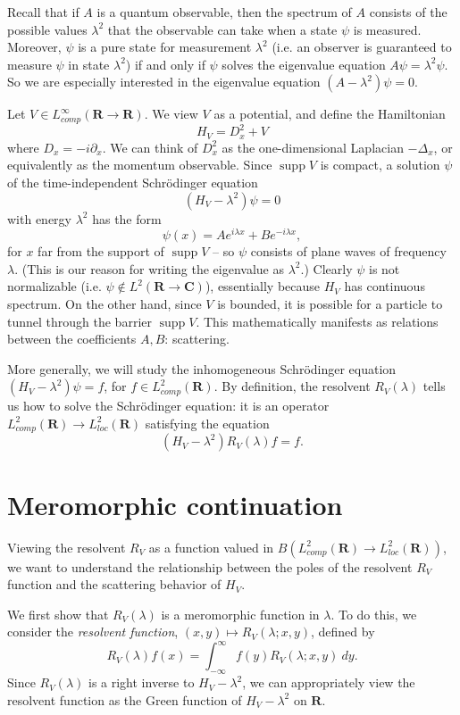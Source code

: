 \documentclass[12pt]{report}
\newcommand{\RR}{\mathbf{R}}
\newcommand{\CC}{\mathbf{C}}
\DeclareMathOperator{\supp}{supp}
\newcommand{\dfn}[1]{\emph{#1}\index{#1}}
\theoremstyle{definition}
\theoremstyle{remark}
\begin{document}

Recall that if $A$ is a quantum observable, then the spectrum of $A$ consists of the possible values $\lambda^2$ that the observable can take when a state $\psi$ is measured. Moreover, $\psi$ is a pure state for measurement $\lambda^2$ (i.e. an observer is guaranteed to measure $\psi$ in state $\lambda^2$) if and only if $\psi$ solves the eigenvalue equation $A\psi = \lambda^2 \psi$. So we are especially interested in the eigenvalue equation $(A - \lambda^2)\psi = 0$.

Let $V \in L^\infty_{comp}(\RR \to \RR)$. We view $V$ as a potential, and define the Hamiltonian
$$H_V = D_x^2 + V$$
where $D_x = -i\partial_x$. We can think of $D_x^2$ as the one-dimensional Laplacian $-\Delta_x$, or equivalently as the momentum observable. Since $\supp V$ is compact, a solution $\psi$ of the time-independent Schrödinger equation
$$(H_V - \lambda^2)\psi = 0$$
with energy $\lambda^2$ has the form
$$\psi(x) = Ae^{i\lambda x} + Be^{-i\lambda x},$$
for $x$ far from the support of $\supp V$ -- so $\psi$ consists of plane waves of frequency $\lambda$. (This is our reason for writing the eigenvalue as $\lambda^2$.) Clearly $\psi$ is not normalizable (i.e. $\psi \notin L^2(\RR \to \CC)$), essentially because $H_V$ has continuous spectrum. On the other hand, since $V$ is bounded, it is possible for a particle to tunnel through the barrier $\supp V$. This mathematically manifests as relations between the coefficients $A,B$: scattering.

More generally, we will study the inhomogeneous Schrödinger equation $(H_V - \lambda^2)\psi = f$, for $f \in L^2_{comp}(\RR)$. By definition, the resolvent $R_V(\lambda)$ tells us how to solve the Schrödinger equation: it is an operator $L^2_{comp}(\RR) \to L^2_{loc}(\RR)$ satisfying the equation
$$(H_V - \lambda^2)R_V(\lambda)f = f.$$

\section{Meromorphic continuation}
Viewing the resolvent $R_V$ as a function valued in $B(L^2_{comp}(\RR) \to L^2_{loc}(\RR))$, we want to understand the relationship between the poles of the resolvent $R_V$ function and the scattering behavior of $H_V$.

We first show that $R_V(\lambda)$ is a meromorphic function in $\lambda$. To do this, we consider the \dfn{resolvent function}, $(x, y) \mapsto R_V(\lambda; x, y)$, defined by
$$R_V(\lambda)f(x) = \int_{-\infty}^\infty f(y) R_V(\lambda; x, y) ~dy.$$
Since $R_V(\lambda)$ is a right inverse to $H_V - \lambda^2$, we can appropriately view the resolvent function as the Green function of $H_V - \lambda^2$ on $\RR$.
\end{document}

